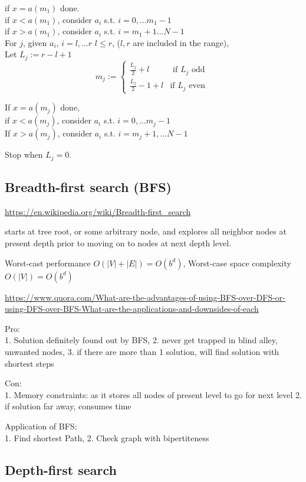 \documentclass[10pt]{amsart}
\begin{document}
\begin{multicols*}{2}
if $x=a(m_1)$ done. \\
if $x< a(m_1)$, consider $a_i$ s.t. $i=0, \dots m_1-1$ \\
if $x>a(m_1)$, consider $a_i$ s.t. $i=m_1+1 \dots N-1$ \\

For $j$, given $a_i$, $i=l, \dots r$ $l\leq r$, ($l, r$ are included in the range), \\
Let $L_j := r - l +1$ \\
\[
m_j := \begin{cases} \frac{L_j}{2} + l & \text{ if $L_j$ odd } \\
\frac{L_j}{2} - 1 + l & \text{if $L_j$ even } \end{cases} 
\]

If $x=a(m_j)$ done, \\
if $x<a(m_j)$, consider $a_i$ s.t. $i=0,\dots m_j -1$ \\
If $x> a(m_j)$, consider $a_i$ s.t. $i=m_j+1, \dots N-1$ 

Stop when $L_j=0$.

\subsection{Breadth-first search (BFS)}

\url{https://en.wikipedia.org/wiki/Breadth-first_search}

starts at tree root, or some arbitrary node, and explores all neighbor nodes at present depth prior to moving on to nodes at next depth level.

Worst-cast performance $O(|V|+|E|) = O(b^d)$, Worst-case space complexity $O(|V|) = O(b^d)$

\url{https://www.quora.com/What-are-the-advantages-of-using-BFS-over-DFS-or-using-DFS-over-BFS-What-are-the-applications-and-downsides-of-each}

Pro: \\
1. Solution definitely found out by BFS, 2. never get trapped in blind alley, unwanted nodes, 3. if there are more than 1 solution, will find solution with shortest steps

Con: \\
1. Memory constraints: as it stores all nodes of present level to go for next level
2. if solution far away, consumes time

Application of BFS: \\
1. Find shortest Path,
2. Check graph with bipertiteness

\subsection{Depth-first search}


\end{multicols*}
\end{document}
